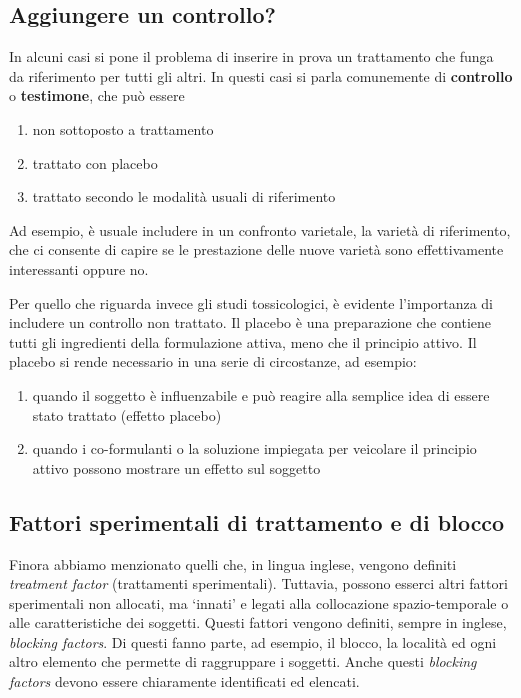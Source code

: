 \documentclass[a4paper,12pt,oneside]{book}
\providecommand{\tightlist}{%
  \setlength{\itemsep}{0pt}\setlength{\parskip}{0pt}}
\theoremstyle{definition}
\theoremstyle{definition}
\theoremstyle{definition}
\theoremstyle{remark}
\begin{document}
\subsection{Aggiungere un controllo?}\label{aggiungere-un-controllo}

In alcuni casi si pone il problema di inserire in prova un trattamento
che funga da riferimento per tutti gli altri. In questi casi si parla
comunemente di \textbf{controllo} o \textbf{testimone}, che può essere

\begin{enumerate}
\def\labelenumi{\arabic{enumi}.}
\tightlist
\item
  non sottoposto a trattamento
\item
  trattato con placebo
\item
  trattato secondo le modalità usuali di riferimento
\end{enumerate}

Ad esempio, è usuale includere in un confronto varietale, la varietà di
riferimento, che ci consente di capire se le prestazione delle nuove
varietà sono effettivamente interessanti oppure no.

Per quello che riguarda invece gli studi tossicologici, è evidente
l'importanza di includere un controllo non trattato. Il placebo è una
preparazione che contiene tutti gli ingredienti della formulazione
attiva, meno che il principio attivo. Il placebo si rende necessario in
una serie di circostanze, ad esempio:

\begin{enumerate}
\def\labelenumi{\arabic{enumi}.}
\tightlist
\item
  quando il soggetto è influenzabile e può reagire alla semplice idea di
  essere stato trattato (effetto placebo)
\item
  quando i co-formulanti o la soluzione impiegata per veicolare il
  principio attivo possono mostrare un effetto sul soggetto
\end{enumerate}

\subsection{Fattori sperimentali di trattamento e di
blocco}\label{fattori-sperimentali-di-trattamento-e-di-blocco}

Finora abbiamo menzionato quelli che, in lingua inglese, vengono
definiti \emph{treatment factor} (trattamenti sperimentali). Tuttavia,
possono esserci altri fattori sperimentali non allocati, ma `innati' e
legati alla collocazione spazio-temporale o alle caratteristiche dei
soggetti. Questi fattori vengono definiti, sempre in inglese,
\emph{blocking factors}. Di questi fanno parte, ad esempio, il blocco,
la località ed ogni altro elemento che permette di raggruppare i
soggetti. Anche questi \emph{blocking factors} devono essere chiaramente
identificati ed elencati.
\end{document}
